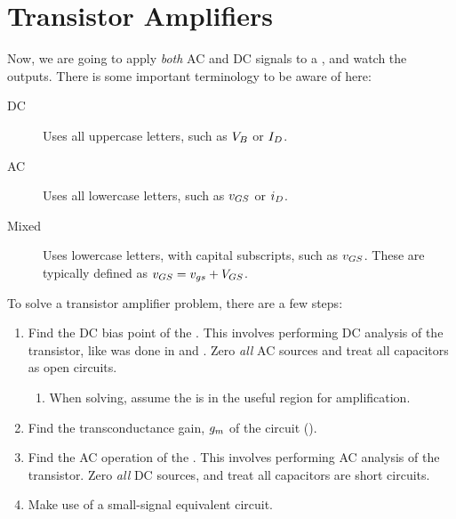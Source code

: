 \section{Transistor Amplifiers}\label{sec:Transistor_Amps}
Now, we are going to apply \emph{both} AC and DC signals to a , and watch the outputs.
There is some important terminology to be aware of here:
\begin{description}
\item[DC] Uses all uppercase letters, such as $\DCVoltage{\Base}$ or $\DCCurrent{\Drain}$.
\item[AC] Uses all lowercase letters, such as $\ACVoltage{\Gate\Source}$ or $\ACCurrent{\Drain}$.
\item[Mixed] Uses lowercase letters, with capital subscripts, such as $\SignalVoltage{GS}$.
  These are typically defined as $\SignalVoltage{GS} = \ACVoltage{GS} + \DCVoltage{GS}$.
\end{description}

To solve a transistor amplifier problem, there are a few steps:
\begin{enumerate}[noitemsep]
\item Find the DC bias point of the .
  This involves performing DC analysis of the transistor, like was done in  and .
  Zero \emph{all} AC sources and treat all capacitors as open circuits.
  \begin{enumerate}[noitemsep]
  \item When solving, assume the  is in the useful region for amplification.
  \end{enumerate}
\item Find the transconductance gain, $g_{m}$ of the circuit ().
\item Find the AC operation of the .
  This involves performing AC analysis of the transistor.
  Zero \emph{all} DC sources, and treat all capacitors are short circuits.
\item Make use of a small-signal equivalent circuit.
\end{enumerate}

